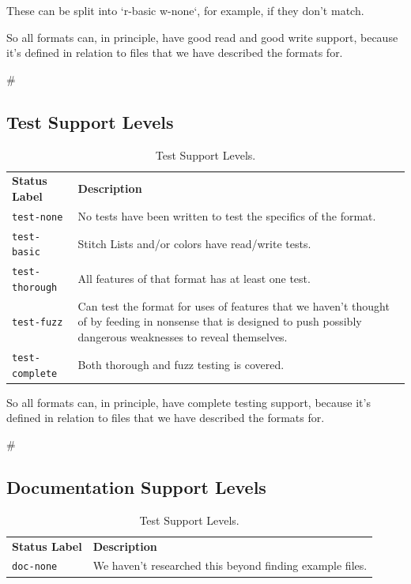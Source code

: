 \documentclass[a4paper]{report}
\begin{document}
{{{{{{{{{These can be split into `r-basic w-none`, for example, if they don't match.

So all formats can, in principle, have good read and good write support, because it's defined in relation to files that we have described the formats for.

#\subsection{Test Support Levels}

\begin{longtable}{p{4cm} p{8cm}}
\caption{Test Support Levels.}
\label{tab:test-support} \\
\textbf{Status Label} &
\textbf{Description} \\

\texttt{test-none} &
No tests have been written to test the specifics of the format. \\

\texttt{test-basic} &
Stitch Lists and/or colors have read/write tests. \\

\texttt{test-thorough} &
All features of that format has at least one test. \\

\texttt{test-fuzz} &
Can test the format for uses of features that we haven't thought of by feeding
in nonsense that is designed to push possibly dangerous weaknesses to reveal
themselves. \\

\texttt{test-complete} &
Both thorough and fuzz testing is covered.
\end{longtable}

So all formats can, in principle, have complete testing support, because it's
defined in relation to files that we have described the formats for.

#\subsection{Documentation Support Levels}

\begin{longtable}{p{4cm} p{8cm}}
\caption{Test Support Levels.}
\label{tab:test-support} \\
\textbf{Status Label} &
\textbf{Description} \\

\texttt{doc-none} &
We haven't researched this beyond finding example files. \\


\end{longtable}}}}}}}}}}
\end{document}
